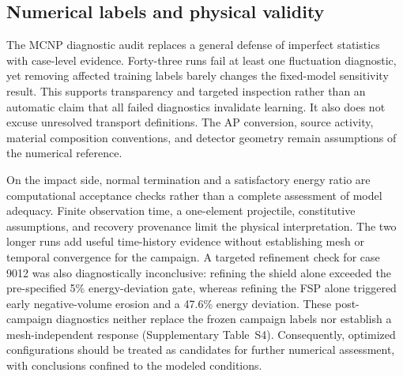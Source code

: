 \documentclass[12pt]{elsarticle}
\begin{document}
\subsection{Numerical labels and physical validity}
The MCNP diagnostic audit replaces a general defense of imperfect statistics with case-level evidence. Forty-three runs fail at least one fluctuation diagnostic, yet removing affected training labels barely changes the fixed-model sensitivity result. This supports transparency and targeted inspection rather than an automatic claim that all failed diagnostics invalidate learning. It also does not excuse unresolved transport definitions. The AP conversion, source activity, material composition conventions, and detector geometry remain assumptions of the numerical reference.

On the impact side, normal termination and a satisfactory energy ratio are computational acceptance checks rather than a complete assessment of model adequacy. Finite observation time, a one-element projectile, constitutive assumptions, and recovery provenance limit the physical interpretation. The two longer runs add useful time-history evidence without establishing mesh or temporal convergence for the campaign. A targeted refinement check for case 9012 was also diagnostically inconclusive: refining the shield alone exceeded the pre-specified 5\% energy-deviation gate, whereas refining the FSP alone triggered early negative-volume erosion and a 47.6\% energy deviation. These post-campaign diagnostics neither replace the frozen campaign labels nor establish a mesh-independent response (Supplementary Table~S4). Consequently, optimized configurations should be treated as candidates for further numerical assessment, with conclusions confined to the modeled conditions.
\end{document}
